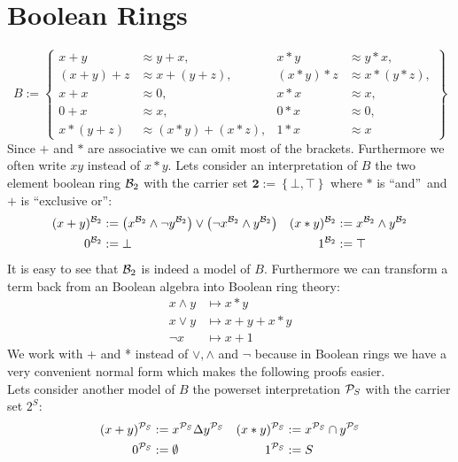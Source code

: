 \section{Boolean Rings}
\[B:=\left\lbrace 
	\begin{aligned}
		x+y     & \approx y+x,         & x*y     & \approx y*x,     \\
		(x+y)+z & \approx x+(y+z),     & (x*y)*z & \approx x*(y*z), \\
		x+x     & \approx 0,           & x*x     & \approx x,       \\
		0+x     & \approx x,           & 0*x     & \approx 0,       \\
		x*(y+z) & \approx (x*y)+(x*z), & 1*x     & \approx x        
	\end{aligned}
	\right\rbrace \]
	Since $+$ and $*$ are associative we can omit most of the brackets. Furthermore we often write $xy$ instead of $x*y$.
	Lets consider an interpretation of $B$ the two element boolean ring ${\mathcal{B}_2}$ with the carrier set $\textbf{2}:=\left\lbrace\bot,\top\right\rbrace$ where $*$ is \textquotedblleft and\textquotedblright\ and $+$ is \textquotedblleft exclusive or\textquotedblright:
	\begin{align*}
		(x+y)^{\mathcal{B}_2} & :=\left( x^{\mathcal{B}_2}\wedge\neg y^{\mathcal{B}_2}\right)  \vee \left( \neg x^{\mathcal{B}_2}\wedge y^{\mathcal{B}_2}\right) & (x*y)^{\mathcal{B}_2} & :=x^{\mathcal{B}_2}\wedge y^{\mathcal{B}_2} \\
		0^{\mathcal{B}_2}     & :=\bot                                                                                      & 1^{\mathcal{B}_2}     & :=\top                
	\end{align*}
	It is easy to see that ${\mathcal{B}_2}$ is indeed a model of $B$. Furthermore we can transform a term back from an Boolean algebra into Boolean ring theory:
	\begin{align*}
		x \wedge y & \mapsto x*y     \\
		x\vee y    & \mapsto x+y+x*y \\
		\neg x     & \mapsto x+1
	\end{align*}
	We work with + and * instead of $\vee,\wedge$ and $\neg$ because in Boolean rings we have a very convenient normal form which makes the following proofs easier.\\
	Lets consider another model of $B$ the powerset interpretation ${\mathcal{P}_S}$ with the carrier set $2^S$:
	\begin{align*}
		(x+y)^{\mathcal{P}_S} & :=x^{\mathcal{P}_S}\Delta y^{\mathcal{P}_S} & (x*y)^{\mathcal{P}_S} & :=x^{\mathcal{P}_S}\cap y^{\mathcal{P}_S} \\
		0^{\mathcal{P}_S}     & :=\emptyset             & 1^{\mathcal{P}_S}     & :=S                   
	\end{align*}
